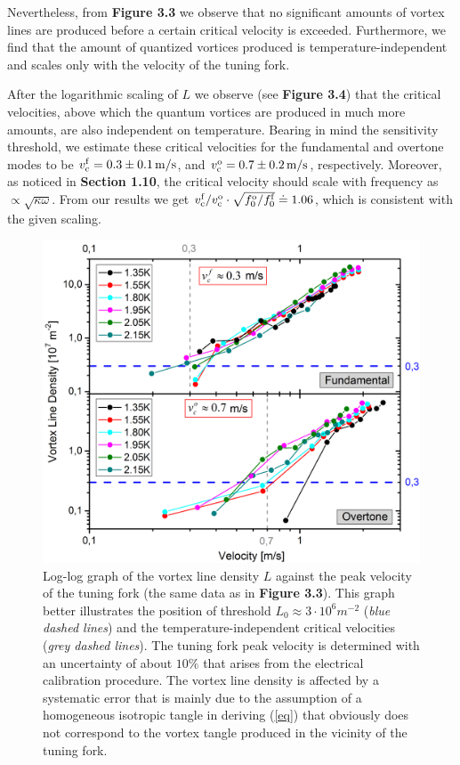 Nevertheless, from {\sffamily\textbf{Figure 3.3}} we observe that no significant amounts of vortex lines are produced before a certain critical velocity is exceeded. Furthermore, we find that the amount of quantized vortices produced is temperature-independent and scales only with the velocity of the tuning fork.

After the logarithmic scaling of $ L $ we observe (see {\sffamily\textbf{Figure 3.4}}) that the critical velocities, above which the quantum vortices are produced in much more amounts, are also independent on temperature.
Bearing in mind the sensitivity threshold, we estimate these critical velocities for the fundamental and overtone modes to be $ v_{\mathrm{c}}^{\mathrm{f}} = 0.3 \pm 0.1 \,\mathrm{m/s}$, and $ v_{\mathrm{c}}^{\mathrm{o}} = 0.7 \pm 0.2 \,\mathrm{m/s} $, respectively. Moreover, as noticed in {\sffamily\textbf{Section 1.10}}, the critical velocity should scale with frequency as $ \propto \sqrt{\kappa\omega} $. From our results we get $ v_{\mathrm{c}}^{\mathrm{f}}/ v_{\mathrm{c}}^{\mathrm{o}} \cdot \sqrt{f_0^{\mathrm{o}}/f_0^{\mathrm{f}}} \doteq 1.06 $, which is consistent with the given scaling.

\newpage

\begin{figure}[h!]
	\centering
	\includegraphics[width=1\textwidth]{graphs/Merged_L_v(log)}
	\caption{Log-log graph of the vortex line density $ L $ against the peak velocity of the tuning fork (the same data as in {\sffamily\textbf{Figure 3.3}}). This graph better illustrates the position of threshold $ L_0 \approx 3\cdot 10^6 \unit{m}^{-2} $ (\textit{blue dashed lines}) and the temperature-independent critical velocities (\textit{grey dashed lines}). The tuning fork peak velocity is determined with an uncertainty of about $ 10\%$ that arises from the electrical calibration procedure\cite{opticalfork}. The vortex line density is affected by a systematic error that is mainly due to the assumption of a homogeneous isotropic tangle in deriving (\ref{eq}) that obviously does not correspond to the vortex tangle produced in the vicinity of the tuning fork.}
\end{figure}


